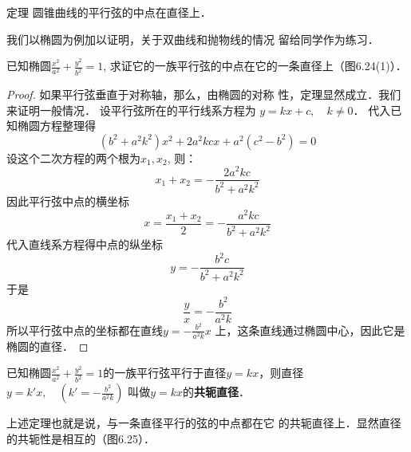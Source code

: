\begin{blk}
  {定理} 圆锥曲线的平行弦的中点在直径上．
\end{blk}

我们以椭圆为例加以证明，关于双曲线和抛物线的情况
留给同学作为练习．

已知椭圆$\frac{x^2}{a^2}+\frac{y^2}{b^2}=1$, 求证它的一族平行弦的中点在它的一条直径上（图6.24(1)）．

\begin{proof}
    如果平行弦垂直于对称轴，那么，由椭圆的对称
性，定理显然成立．我们来证明一般情况．
设平行弦所在的平行线系方程为
$y=kx+c,\quad k\ne 0$．
代入已知椭圆方程整理得
\[(b^2+a^2k^2)x^2+2a^2kcx+a^2(c^2-b^2)=0\]
设这个二次方程的两个根为$x_1,x_2$, 则：
\[x_1+x_2=-\frac{2a^2kc}{b^2+a^2k^2}\]
因此平行弦中点的横坐标
\[x=\frac{x_1+x_2}{2}=-\frac{a^2kc}{b^2+a^2k^2}\]
代入直线系方程得中点的纵坐标
\[y=-\frac{b^2c}{b^2+a^2k^2}\]
于是
\[\frac{y}{x}=-\frac{b^2}{a^2k}\]
所以平行弦中点的坐标都在直线$y=-\frac{b^2}{a^2k}x$
上，这条直线通过椭圆中心，因此它是椭圆的直径．
\end{proof}

已知椭圆$\frac{x^2}{a^2}+\frac{y^2}{b^2}=1$的一族平行弦平行于直径$y=kx$，则直径$y=k'x,\quad \left(k'=-\frac{b^2}{a^2k}\right)$
叫做$y=kx$的\textbf{共轭直径}．

上述定理也就是说，与一条直径平行的弦的中点都在它
的共轭直径上．显然直径的共轭性是相互的（图6.25）．

\begin{figure}[htp]\centering
    \begin{minipage}[t]{0.48\textwidth}
    \centering
{}
    \caption{}
    \end{minipage}
    \begin{minipage}[t]{0.48\textwidth}
    \centering
    \caption{}
    \end{minipage}
    \end{figure}


